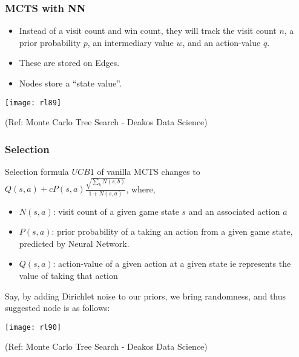 \begin{frame}[fragile]\frametitle{MCTS with NN}

\begin{itemize}
\item Instead of a visit count and win count, they will track the visit count $n$, a prior probability $p$, an intermediary value $w$, and an action-value $q$.
\item These are stored on Edges. 
\item Nodes store a ``state value''.
\end{itemize}

\begin{center}
\texttt{[image: rl89]}
\end{center}


{\tiny (Ref: Monte Carlo Tree Search - Deakos Data Science)}

\end{frame}

\begin{frame}[fragile]\frametitle{Selection}

Selection formula $UCB1$ of vanilla MCTS changes to $Q(s,a) + c P(s,a) \frac{\sqrt{\sum_bN(s,b)}}{1+N(s,a)}$, where, 

\begin{itemize}
\item $N(s,a)$:  visit count of a given game state $s$ and an associated action $a$
\item $P(s,a)$: prior probability of a taking an action from a given game state, predicted by Neural Network.
\item $Q(s,a)$: action-value of a given action at a given state ie represents the value of taking that action
\end{itemize}

Say, by adding Dirichlet noise to our priors, we bring randomness, and thus suggested node is as follows:

\begin{center}
\texttt{[image: rl90]}
\end{center}

{\tiny (Ref: Monte Carlo Tree Search - Deakos Data Science)}

\end{frame}

